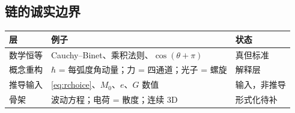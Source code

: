 \documentclass[aps,prd,preprint,superscriptaddress,amsmath,amssymb]{revtex4-2}
\begin{document}
\subsection{链的诚实边界}
\label{app:boundaries}

\begin{center}
\begin{tabular}{l p{7cm} p{3.5cm}}
\toprule
层 & 例子 & 状态 \\
\midrule
数学恒等 & Cauchy--Binet、乘积法则、$\cos(\theta+\pi)$ & 真但标准 \\
概念重构 & $\hbar$ = 每弧度角动量；力 = 四通道；光子 = 螺旋 & 解释层 \\
推导输入 & \eqref{eq:rchoice}、$M_0$、$e$、$G$ 数值 & 输入，非推导 \\
骨架 & 波动方程；电荷 = 散度；连续 3D & 形式化待补 \\
\bottomrule
\end{tabular}
\end{center}


\end{document}
